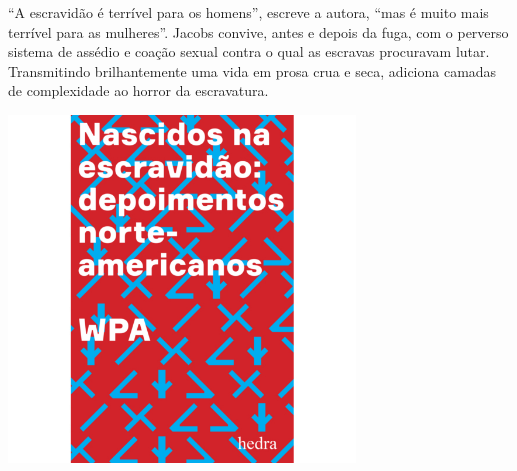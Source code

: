 “A escravidão é terrível para os homens”, escreve a autora, “mas é muito mais terrível para as mulheres”. Jacobs convive, antes e depois da fuga, com o perverso sistema de assédio e coação sexual contra o qual as escravas procuravam lutar. Transmitindo brilhantemente uma vida em prosa crua e seca, {} adiciona camadas de complexidade ao horror da escravatura.

\vfill

\hspace*{-.4cm}\begin{minipage}[c]{.5\linewidth}
\small{
{}}
\end{minipage}


\pagebreak

\hspace{.5cm}

\begin{center}
\hspace*{-2.5cm}
\hspace*{2.5cm}\includegraphics[width=92mm]{./grid/wpa.jpg}
\end{center}

